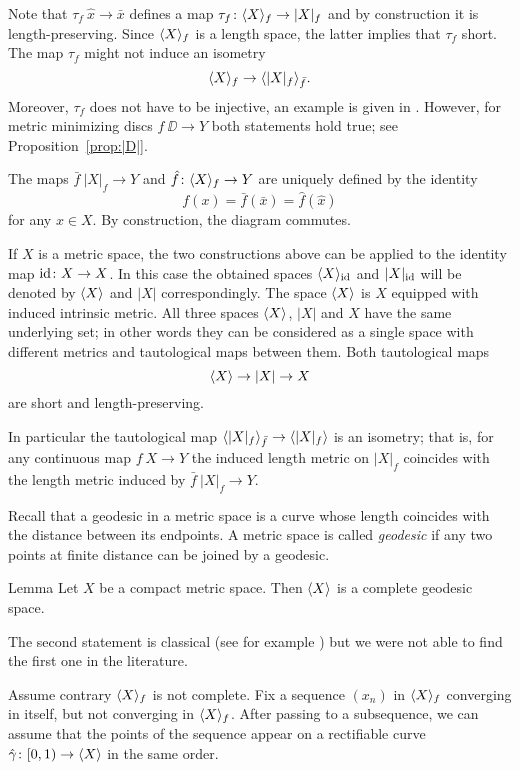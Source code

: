 \documentclass{article}
\begin{document}
Note that $\tau_f\: \hat x\to \bar x$ defines a map $\tau_f\: \<X\>_f\zz\to |X|_f$ and by construction it is length-preserving.
Since $\langle X\rangle_f$ is a length space, the latter implies that $\tau_f$ short.
The map $\tau_f$ might not induce an isometry
\[\langle X\rangle_f\to\langle|X|_f\rangle_{\bar f}.\]
Moreover, $\tau_f$ does not have to be injective, an example is given in \cite[4.2]{petrunin-intrinisic}.
However, for metric minimizing discs $f\:\DD\to Y$ both statements hold true; see
Proposition~\ref{prop:|D|}.

The maps $\bar f\:|X|_f\to Y$ and $ \hat f\colon\langle X\rangle_f\to Y$ are uniquely defined by the identity
\[f(x)=\bar f(\bar x)=  \hat f( \hat x)\] for any $x\in X$.
By construction, the diagram commutes.

If $X$ is a metric space, the two constructions above can be applied to the identity map $\mathrm{id}\colon X\to X$.
In this case the obtained spaces $\langle X\rangle_{\mathrm{id}}$ and $|X|_{\mathrm{id}}$ will be denoted by $\langle X\rangle$ and $|X|$ correspondingly.
The space $\langle X\rangle$ is $X$ equipped with induced intrinsic metric.
All three spaces $\langle X\rangle$, $|X|$ and $X$ have the same underlying set;
in other words they can be considered as a single space with different metrics and tautological maps between them.
Both tautological maps 
\[\langle X\rangle\to |X|\to X\]
are short and length-preserving.

In particular the tautological map $\<|X|_f\>_{\bar f}\zz\to \<|X|_f\>$ is an isometry;
that is, for any continuous map $f\:X\to Y$ the induced length metric on $|X|_f$ coincides with the length metric induced by 
$\bar f\:|X|_f\to Y$.


Recall that a geodesic in a metric space is a curve whose length coincides with the distance between its endpoints.
A metric space is called \emph{geodesic} if any two points at finite distance can be joined by a geodesic.

\begin{thm}{Lemma}\label{lem:geospace}
Let $X$ be a compact metric space. 
Then $\langle X\rangle$ is a complete geodesic space.
\end{thm}

The second statement is classical (see for example \cite[II-\S8 Thm. 3]{KF}) but 
we were not able to find the first one in the literature.

Assume contrary $\langle X\rangle_f$ is not complete.
Fix a sequence $(x_n)$ in $\langle X\rangle_f$ converging in itself, but not converging in $\langle X\rangle_f$.
After passing to a subsequence, we can assume that the points of the sequence appear on a rectifiable curve $\hat\gamma\colon[0,1)\to\langle X\rangle$ in the same order.
\end{document}
